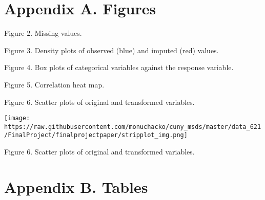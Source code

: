 \documentclass[
]{article}
\begin{document}
\hypertarget{appendix-a.-figures}{%
\section{Appendix A. Figures}\label{appendix-a.-figures}}

\begin{center}
Figure 2. Missing values.
\end{center}

\begin{center}
Figure 3. Density plots of observed (blue) and imputed (red) values.
\end{center}

\begin{center}
Figure 4. Box plots of categorical variables against the response variable.
\end{center}

\begin{center}
Figure 5. Correlation heat map.
\end{center}

\begin{center}
Figure 6. Scatter plots of original and transformed variables.
\end{center}

\texttt{[image: https://raw.githubusercontent.com/monuchacko/cuny\_msds/master/data\_621/FinalProject/finalprojectpaper/stripplot\_img.png]}

\begin{center}
Figure 6. Scatter plots of original and transformed variables.
\end{center}

\newpage

\hypertarget{appendix-b.-tables}{%
\section{Appendix B. Tables}\label{appendix-b.-tables}}
\end{document}

